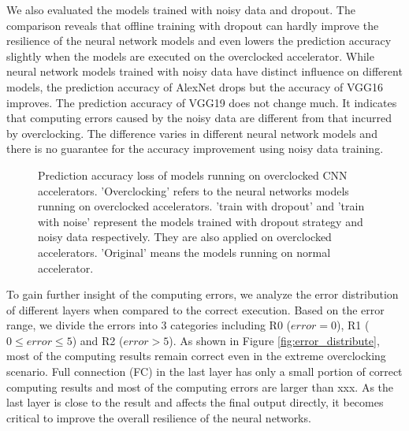 We also evaluated the models trained with noisy data and dropout. 
The comparison reveals that offline training with dropout can hardly 
improve the resilience of the neural network models and even lowers the 
prediction accuracy slightly when the models are executed on the 
overclocked accelerator. While neural network models trained with 
noisy data have distinct influence on different models, the 
prediction accuracy of AlexNet drops but the accuracy of VGG16 
improves. The prediction accuracy of VGG19 does not change much.
It indicates that computing errors caused by the noisy data are 
different from that incurred by overclocking. The difference varies 
in different neural network models and there is no guarantee 
for the accuracy improvement using noisy data training.
\begin{figure}
        \center
        \qquad
        \caption{Prediction accuracy loss of models running on overclocked CNN accelerators.
			'Overclocking' refers to the neural networks models running on overclocked accelerators. 
'train with dropout' and 'train with noise' represent the models trained with dropout strategy 
and noisy data respectively. They are also applied on overclocked accelerators. 
'Original' means the models running on normal accelerator.
 }
 \vspace{-1em}
        \label{fig:accuracy-dropout-noisy}
\end{figure}

To gain further insight of the computing errors, we analyze the error distribution 
of different layers when compared to the correct execution. Based on the error range, 
we divide the errors into 3 categories including R0 ($error = 0$), 
R1 ($0 \leq error \leq 5$) and R2 ($error > 5$). As shown in 
Figure \ref{fig:error_distribute}, most of the computing results remain 
correct even in the extreme overclocking scenario. Full connection (FC) in the last layer 
has only a small portion of correct computing results and most of the computing errors are 
larger than xxx. As the last layer is close to the result and affects the final output 
directly, it becomes critical to improve the overall resilience of the neural 
networks. 

\begin{figure*}
        \caption{Computing error distribution across the different layers}
        \label{fig:error_distribute}
\end{figure*}

